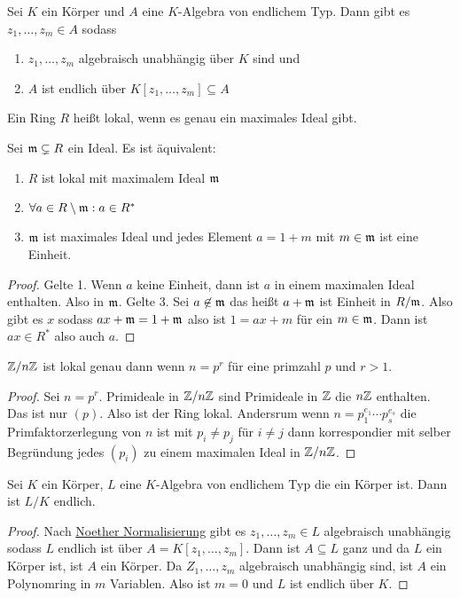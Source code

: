 \begin{Satz}\label{Satz:NoetherNor}
Sei $K$ ein Körper und $A$ eine $K$-Algebra von endlichem Typ. Dann gibt es $z_1,\dots,z_m\in A$ sodass
\begin{enumerate}
    \item $z_1,\dots,z_m$ algebraisch unabhängig über $K$ sind und
    \item $A$ ist endlich über $K[z_1,\dots,z_m]\subseteq A$
\end{enumerate}
\end{Satz}
\begin{Def}
    Ein Ring $R$ heißt lokal, wenn es genau ein maximales Ideal gibt.
\end{Def}
\begin{Satz}
    Sei $\mathfrak{m}\subsetneq R$ ein Ideal. Es ist äquivalent:
    \begin{enumerate}
        \item $R$ ist lokal mit maximalem Ideal $\mathfrak{m}$
        \item $\forall a\in R\setminus \mathfrak{m}: a\in R^*$
        \item $\mathfrak{m}$ ist maximales Ideal und jedes Element $a=1+m$ mit $m\in\mathfrak{m}$ ist eine Einheit.
    \end{enumerate}
\end{Satz}
\begin{proof}
    Gelte 1. Wenn $a$ keine Einheit, dann ist $a$ in einem maximalen Ideal enthalten. Also in $\mathfrak{m}$.
    Gelte 3. Sei $a\not \in\mathfrak{m}$ das heißt $a+\mathfrak{m}$ ist Einheit in $R/\mathfrak{m}$. Also gibt es $x$ sodass $ax+\mathfrak{m}=1+\mathfrak{m}$ also ist $1=ax+m$ für ein $m\in\mathfrak{m}$. Dann ist $ax\in R^*$ also auch $a$.
\end{proof}
\begin{Lemma}
    $\mathbb{Z}/n\mathbb{Z}$ ist lokal genau dann wenn $n=p^r$ für eine primzahl $p$ und $r>1$.
\end{Lemma}
\begin{proof}
    Sei $n=p^r$. Primideale in $\mathbb{Z}/n\mathbb{Z}$ sind Primideale in $\mathbb{Z}$ die $n\mathbb{Z}$ enthalten. Das ist nur $(p)$. Also ist der Ring lokal.
    Andersrum wenn $n=p_1^{e_1}\cdots p_s^{e_s}$ die Primfaktorzerlegung von $n$ ist mit $p_i\neq p_j$ für $i\neq j$ dann korrespondier mit selber Begründung jedes $(p_i)$ zu einem maximalen Ideal in $\mathbb{Z}/n\mathbb{Z}$.
\end{proof}
\begin{Satz}\label{Satz:WeakNst}
Sei $K$ ein Körper, $L$ eine $K$-Algebra von endlichem Typ die ein Körper ist.
Dann ist $L/K$ endlich.
    
\end{Satz}
\begin{proof}
    Nach \hyperref[Satz:NoetherNor]{Noether Normalisierung} gibt es $z_1,\dots,z_m\in L$ algebraisch unabhängig sodass $L$ endlich ist über $A=K[z_1,\dots,z_m]$.
    Dann ist $A\subseteq L$ ganz und da $L$ ein Körper ist, ist $A$ ein Körper.
    Da $Z_1,\dots,z_m$ algebraisch unabhängig sind, ist $A$ ein Polynomring in $m$ Variablen. Also ist $m=0$ und $L$ ist endlich über $K$.
\end{proof}
